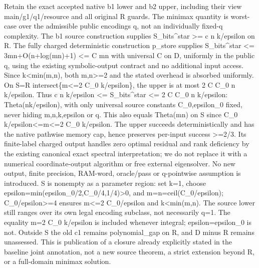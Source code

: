 \documentclass[10pt,a4paper]{article}
\begin{document}
\begingroup\raggedright\sloppy Retain the exact accepted native b1 lower and b2 upper,\allowbreak{} including their view main/\allowbreak{}g1/\allowbreak{}q1/\allowbreak{}resource and all original R guards. The minimax quantity is worst-case over the admissible public encodings q,\allowbreak{} not an individually fixed-q complexity. The b1 source construction supplies S\_\allowbreak{}bits\textasciicircum{}star >=\allowbreak{} c n k/\allowbreak{}epsilon on R. The fully charged deterministic construction p\_\allowbreak{}store supplies S\_\allowbreak{}bits\textasciicircum{}star <=\allowbreak{} 3mn+O(n+log(mn)+1) <=\allowbreak{} C mn with universal C on D,\allowbreak{} uniformly in the public q,\allowbreak{} using the existing symbolic-output contract and no additional input access. Since k<min(m,\allowbreak{}n),\allowbreak{} both m,\allowbreak{}n>=\allowbreak{}2 and the stated overhead is absorbed uniformly. On S=\allowbreak{}R intersect\{m<=\allowbreak{}2 C\_\allowbreak{}0 k/\allowbreak{}epsilon\},\allowbreak{} the upper is at most 2 C C\_\allowbreak{}0 n k/\allowbreak{}epsilon. Thus c n k/\allowbreak{}epsilon <=\allowbreak{} S\_\allowbreak{}bits\textasciicircum{}star <=\allowbreak{} 2 C C\_\allowbreak{}0 n k/\allowbreak{}epsilon:\allowbreak{} Theta(nk/\allowbreak{}epsilon),\allowbreak{} with only universal source constants C\_\allowbreak{}0,\allowbreak{}epsilon\_\allowbreak{}0 fixed,\allowbreak{} never hiding m,\allowbreak{}n,\allowbreak{}k,\allowbreak{}epsilon or q. This also equals Theta(mn) on S since C\_\allowbreak{}0 k/\allowbreak{}epsilon<=\allowbreak{}m<=\allowbreak{}2 C\_\allowbreak{}0 k/\allowbreak{}epsilon. The upper succeeds deterministically and has the native pathwise memory cap,\allowbreak{} hence preserves per-input success >=\allowbreak{}2/\allowbreak{}3. Its finite-label charged output handles zero optimal residual and rank deficiency by the existing canonical exact spectral interpretation;\allowbreak{} we do not replace it with a numerical coordinate-output algorithm or free external eigensolver. No new output,\allowbreak{} finite precision,\allowbreak{} RAM-word,\allowbreak{} oracle/\allowbreak{}pass or q-pointwise assumption is introduced. S is nonempty as a parameter region:\allowbreak{} set k=\allowbreak{}1,\allowbreak{} choose epsilon=\allowbreak{}min(epsilon\_\allowbreak{}0/\allowbreak{}2,\allowbreak{}C\_\allowbreak{}0/\allowbreak{}4,\allowbreak{}1/\allowbreak{}4)>0,\allowbreak{} and m=\allowbreak{}n=\allowbreak{}ceil(C\_\allowbreak{}0/\allowbreak{}epsilon);\allowbreak{} C\_\allowbreak{}0/\allowbreak{}epsilon>=\allowbreak{}4 ensures m<=\allowbreak{}2 C\_\allowbreak{}0/\allowbreak{}epsilon and k<min(m,\allowbreak{}n). The source lower still ranges over its own legal encoding subclass,\allowbreak{} not necessarily q=\allowbreak{}1. The equality m=\allowbreak{}2 C\_\allowbreak{}0 k/\allowbreak{}epsilon is included whenever integral;\allowbreak{} epsilon=\allowbreak{}epsilon\_\allowbreak{}0 is not. Outside S the old c1 remains polynomial\_\allowbreak{}gap on R,\allowbreak{} and D minus R remains unassessed. This is publication of a closure already explicitly stated in the baseline joint annotation,\allowbreak{} not a new source theorem,\allowbreak{} a strict extension beyond R,\allowbreak{} or a full-domain minimax solution.\par\endgroup
\end{document}
